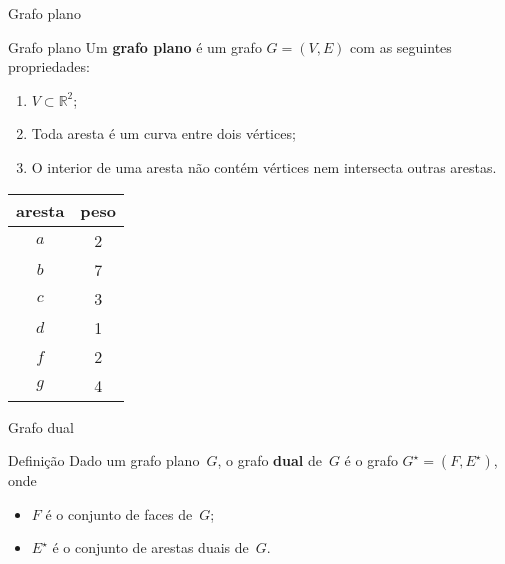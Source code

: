 \documentclass{IFES-beamer}
\newcommand{\R}{\mathbb{R}}
\newcommand{\defi}[1]{\textbf{#1}} %
\begin{document}
\begin{frame}{Grafo plano}
\begin{block}{Grafo plano}
Um \defi{grafo plano} é um grafo $G = (V, E)$ com as seguintes propriedades:
\begin{enumerate}
\item $V\subset \R^2$;
		\item Toda aresta é um curva entre dois vértices;
\item O interior de uma aresta não contém vértices nem intersecta outras arestas.
\end{enumerate}
\end{block}
\begin{minipage}[H]{0.4\textwidth}
\begin{tabular}{| c | c |} 
 \hline
 aresta & peso\\
 \hline
 $a$ & 2 \\ 
 \hline
$b$ & 7 \\
 \hline
$c$ & 3 \\
 \hline
$d$ & 1 \\
 \hline
$f$ & 2 \\
 \hline
$g$ & 4 \\
 \hline
\end{tabular}
\end{minipage}
\begin{minipage}[H]{0.4\textwidth}
\begin{figure}[H]
\scalebox{1}{

	}
\end{figure}
\end{minipage}

\end{frame}




\begin{frame}{Grafo dual}
\begin{block}{Definição}
Dado um grafo plano~$G$, o grafo \defi{dual} de~$G$ é o grafo $G^\star = (F,E^\star)$, onde
\begin{itemize}
\item $F$ é o conjunto de faces de~$G$;
\item $E^\star$ é o conjunto de arestas duais de~$G$.
\end{itemize}
\end{block}
\begin{figure}[H]
\scalebox{1.2}{
\centering

}
\label{fig:MSF-basico-1}
\end{figure}
\end{frame}
\end{document}
